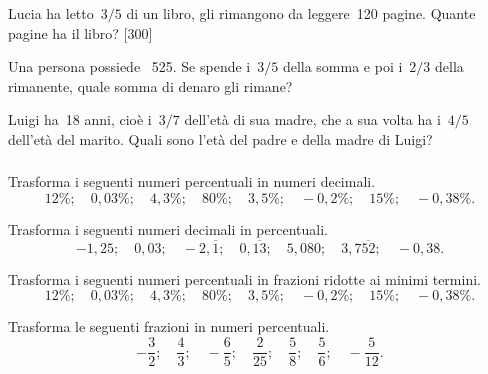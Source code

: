 \begin{esercizio}[\Ast]
 \label{ese:3.76}
Lucia ha letto~$3/5$ di un libro, gli rimangono da leggere~120 pagine. 
Quante pagine ha il libro? \hfill [300]
\end{esercizio}

\begin{esercizio}
 \label{ese:3.77}
Una persona possiede \officialeuro\ 525. Se spende i~$3/5$ della somma e 
poi i~$2/3$ della rimanente, quale somma di denaro gli rimane?
\end{esercizio}

\begin{esercizio}
 \label{ese:3.78}
Luigi ha~18 anni, cioè i~$3/7$ dell'età di sua madre, che a sua volta ha 
i~$4/5$ dell'età del marito. Quali sono l'età del padre e della madre di Luigi?
\end{esercizio}

\subsubsection*{}

\begin{esercizio}
 \label{ese:3.79}
Trasforma i seguenti numeri percentuali in numeri decimali.
\[12\%;\quad0,03\%;\quad4,3\%;\quad80\%;\quad3,5\%;\quad-0,2\%;\quad15\%;
\quad-0,38\%.\]
\end{esercizio}

\begin{esercizio}
 \label{ese:3.80}
Trasforma i seguenti numeri decimali in percentuali.
\[-1,25;\quad0,03;\quad-2,\overline{1};\quad0,\overline{13};\quad5,080;
\quad3,7\overline{52};\quad-0,38.\]
\end{esercizio}

\begin{esercizio}
 \label{ese:3.81}
Trasforma i seguenti numeri percentuali in frazioni ridotte ai minimi termini.
\[12\%;\quad0,03\%;\quad4,3\%;\quad80\%;\quad3,5\%;\quad-0,2\%;\quad15\%;
\quad-0,38\%.\]
\end{esercizio}

\begin{esercizio}
\label{ese:3.82}
Trasforma le seguenti frazioni in numeri percentuali.
\[-\frac{3}{2};\quad\frac{4}{3};\quad-\frac{6}{5};\quad\frac{2}{25};
\quad\frac{5}{8};\quad\frac{5}{6};\quad-\frac{5}{12}.\]
\end{esercizio}

